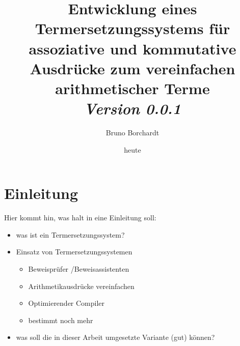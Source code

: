 \documentclass{article}
\title{Entwicklung eines Termersetzungssystems für assoziative und kommutative Ausdrücke zum vereinfachen arithmetischer Terme\\ \textit{Version 0.0.1}}
\author{Bruno Borchardt}
\date{heute}
\begin{document}
\maketitle

\tableofcontents

\clearpage

\section{Einleitung}

Hier kommt hin, was halt in eine Einleitung soll:
\begin{itemize}
    \item was ist ein Termersetzungssystem?
    \item Einsatz von Termersetzungssystemen
    \begin{itemize}
        \item Beweisprüfer /Beweisassistenten
        \item Arithmetikausdrücke vereinfachen
        \item Optimierender Compiler
        \item bestimmt noch mehr
    \end{itemize}
    \item was soll die in dieser Arbeit umgesetzte Variante (gut) können?
    
\end{itemize}
\end{document}
